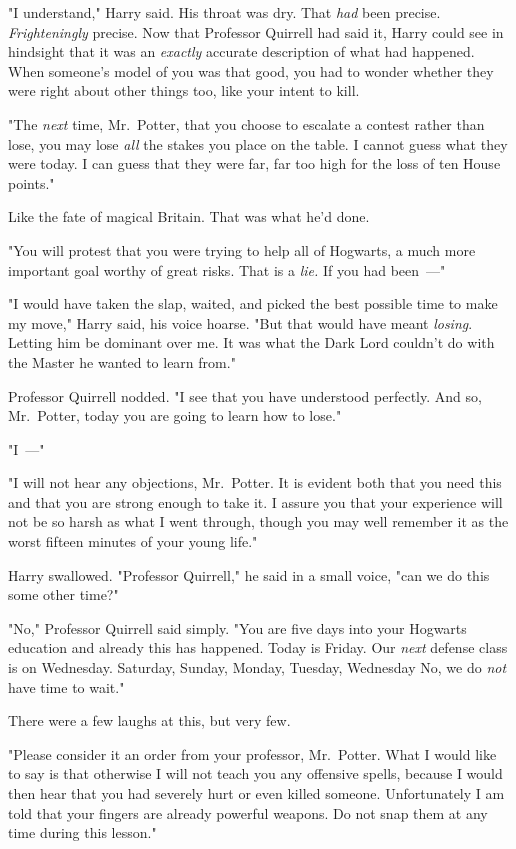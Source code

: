 "I understand," Harry said. His throat was dry. That \emph{had} been precise.
\emph{Frighteningly} precise. Now that Professor Quirrell had said it, Harry
could see in hindsight that it was an \emph{exactly} accurate description of
what had happened. When someone's model of you was that good, you had to wonder
whether they were right about other things too, like your intent to kill.

"The \emph{next} time, Mr.~Potter, that you choose to escalate a contest rather
than lose, you may lose \emph{all} the stakes you place on the table. I cannot
guess what they were today. I can guess that they were far, far too high for
the loss of ten House points."

Like the fate of magical Britain. That was what he'd done.

"You will protest that you were trying to help all of Hogwarts, a much more
important goal worthy of great risks. That is a \emph{lie.} If you had been~---"

"I would have taken the slap, waited, and picked the best possible time to make
my move," Harry said, his voice hoarse. "But that would have meant
\emph{losing}. Letting him be dominant over me. It was what the Dark Lord
couldn't do with the Master he wanted to learn from."

Professor Quirrell nodded. "I see that you have understood perfectly. And so,
Mr.~Potter, today you are going to learn how to lose."

"I~---"

"I will not hear any objections, Mr.~Potter. It is evident both that you need
this and that you are strong enough to take it. I assure you that your
experience will not be so harsh as what I went through, though you may well
remember it as the worst fifteen minutes of your young life."

Harry swallowed. "Professor Quirrell," he said in a small voice, "can we do
this some other time?"

"No," Professor Quirrell said simply. "You are five days into your Hogwarts
education and already this has happened. Today is Friday. Our \emph{next}
defense class is on Wednesday. Saturday, Sunday, Monday, Tuesday,
Wednesday{\el} No, we do \emph{not} have time to wait."

There were a few laughs at this, but very few.

"Please consider it an order from your professor, Mr.~Potter. What I would like
to say is that otherwise I will not teach you any offensive spells, because I
would then hear that you had severely hurt or even killed someone.
Unfortunately I am told that your fingers are already powerful weapons. Do not
snap them at any time during this lesson."

